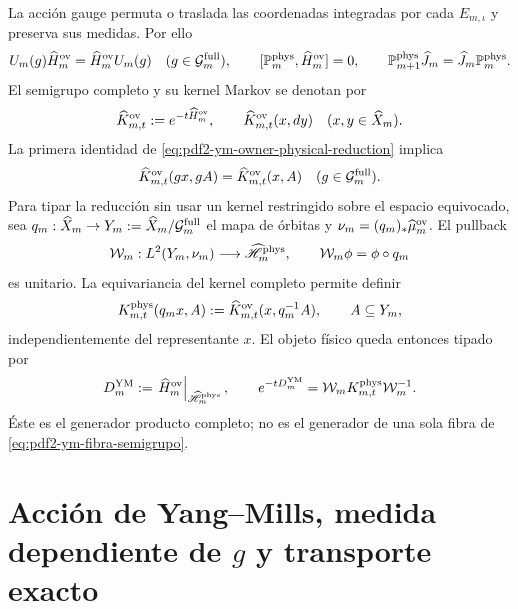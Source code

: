 La acción gauge permuta o traslada las coordenadas integradas por cada
$E_{m,\iota}$ y
preserva sus medidas. Por ello
\begin{equation}\label{eq:pdf2-ym-owner-physical-reduction}
 U_m(g)\widehat H_m^{\rm ov}=\widehat H_m^{\rm ov}U_m(g)
 \quad(g\in\mathcal G_m^{\rm full}),
 \qquad
 [\mathbb P_m^{\rm phys},\widehat H_m^{\rm ov}]=0,
 \qquad
 \mathbb P_{m+1}^{\rm phys}\widehat J_m
 =\widehat J_m\mathbb P_m^{\rm phys}.
\end{equation}
El semigrupo completo y su kernel Markov se denotan por
\begin{equation}\label{eq:pdf2-ym-owner-full-kernel}
 \widehat K_{m,t}^{\rm ov}:=e^{-t\widehat H_m^{\rm ov}},
 \qquad
\widehat K_{m,t}^{\rm ov}(x,dy)
 \quad(x,y\in\widehat X_m).
\end{equation}
La primera identidad de \eqref{eq:pdf2-ym-owner-physical-reduction} implica
\begin{equation}\label{eq:pdf2-ym-owner-full-kernel-equivariance}
 \widehat K_{m,t}^{\rm ov}(gx,gA)
 =\widehat K_{m,t}^{\rm ov}(x,A)
 \quad(g\in\mathcal G_m^{\rm full}).
\end{equation}
Para tipar la reducción sin usar un kernel restringido sobre el espacio equivocado,
sea $q_m:\widehat X_m\to Y_m:=\widehat X_m/\mathcal G_m^{\rm full}$ el mapa de
órbitas y $\nu_m=(q_m)_*\widehat\mu_m^{\rm ov}$. El pullback
\begin{equation}\label{eq:pdf2-ym-owner-quotient-unitary}
 \mathcal W_m:L^2(Y_m,\nu_m)\longrightarrow
 \widehat{\mathscr H}_m^{\rm phys},
 \qquad \mathcal W_m\phi=\phi\circ q_m
\end{equation}
es unitario. La equivariancia del kernel completo permite definir
\begin{equation}\label{eq:pdf2-ym-owner-physical-kernel}
 K_{m,t}^{\rm phys}(q_mx,A)
 :=\widehat K_{m,t}^{\rm ov}(x,q_m^{-1}A),
 \qquad A\subseteq Y_m,
\end{equation}
independientemente del representante $x$. El objeto físico queda entonces tipado por
\begin{equation}\label{eq:pdf2-ym-owner-D}
 D_m^{\rm YM}
 :=\left.\widehat H_m^{\rm ov}\right|_{\widehat{\mathscr H}_m^{\rm phys}},
 \qquad
 e^{-tD_m^{\rm YM}}
 =\mathcal W_mK_{m,t}^{\rm phys}\mathcal W_m^{-1}.
\end{equation}
Éste es el generador producto completo; no es el generador de una sola fibra de
\eqref{eq:pdf2-ym-fibra-semigrupo}.

\section{Acción de Yang--Mills, medida dependiente de $g$ y transporte exacto}

